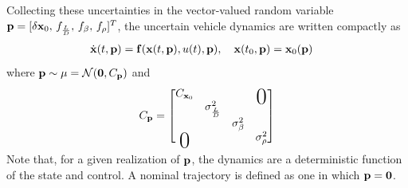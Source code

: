 Collecting these uncertainties in the vector-valued random variable $\mathbf{p} = [\delta\mathbf{x}_0,\, f_{\frac{L}{D}},\, f_{\beta},\, f_{\rho}]^T$, the uncertain vehicle dynamics are written compactly as
\begin{align}
	\dot{\mathbf{x}}(t,\mathbf{p}) &= \mathbf{f}(\mathbf{x}(t,\mathbf{p}), u(t), \mathbf{p}),\quad
		\mathbf{x}(t_0,\mathbf{p}) = \mathbf{x}_0(\mathbf{p}) \label{Eq:UncertainDynamics}
\end{align}
where $\mathbf{p} \sim \mu = \mathcal{N}(\mathbf{0},C_{\mathbf{p}})$ and 
\begin{align}
	\cov_{\param} = \begin{bmatrix}
		\cov_{\state_0} & & &\bigzero \\ 
		 &\sigma^2_{\frac{L}{D}} \\
		 & & \sigma^2_{\beta} \\
		\bigzero & & & \sigma^2_{\rho}
	\end{bmatrix}
\end{align}
Note that, for a given realization of $\mathbf{p}$, the dynamics are a deterministic function of the state and control. A nominal trajectory is defined as one in which $\mathbf{p}=\mathbf{0}$.

